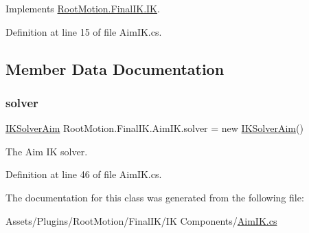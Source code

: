 Implements \mbox{\hyperlink{class_root_motion_1_1_final_i_k_1_1_i_k_a1922e31d550e27dcc60eca0d62c699c5}{Root\+Motion.\+Final\+I\+K.\+IK}}.



Definition at line 15 of file Aim\+I\+K.\+cs.



\subsection{Member Data Documentation}
\mbox{\label{class_root_motion_1_1_final_i_k_1_1_aim_i_k_ac5a13750eca876add0b9a5c3f57d2bda}} 
\subsubsection{\texorpdfstring{solver}{solver}}
{\footnotesize\ttfamily \mbox{\hyperlink{class_root_motion_1_1_final_i_k_1_1_i_k_solver_aim}{I\+K\+Solver\+Aim}} Root\+Motion.\+Final\+I\+K.\+Aim\+I\+K.\+solver = new \mbox{\hyperlink{class_root_motion_1_1_final_i_k_1_1_i_k_solver_aim}{I\+K\+Solver\+Aim}}()}



The Aim IK solver. 



Definition at line 46 of file Aim\+I\+K.\+cs.



The documentation for this class was generated from the following file\+:\begin{DoxyCompactItemize}
\item 
Assets/\+Plugins/\+Root\+Motion/\+Final\+I\+K/\+I\+K Components/\mbox{\hyperlink{_aim_i_k_8cs}{Aim\+I\+K.\+cs}}\end{DoxyCompactItemize}
